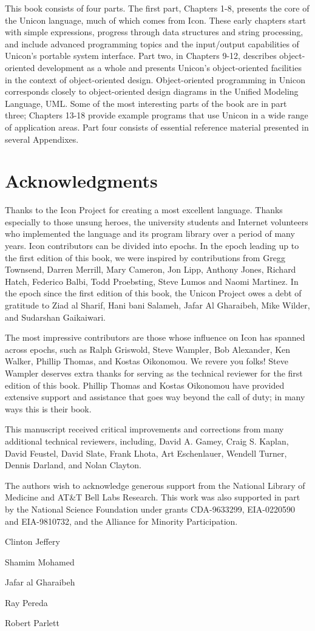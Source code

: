 This book consists of four parts. The first part, Chapters 1-8, presents
the core of the Unicon language, much of which comes from Icon. These
early chapters start with simple expressions, progress through data
structures and string processing, and include advanced programming
topics and the input/output capabilities of Unicon's
portable system interface. Part two, in Chapters 9-12,
describes object-oriented development as a whole and presents
Unicon's object-oriented facilities in the context of
object-oriented design. Object-oriented programming in Unicon
corresponds closely to object-oriented design diagrams in the Unified
Modeling Language, UML. Some of the most interesting parts of the book
are in part three; Chapters 13-18 provide example programs that use
Unicon in a wide range of application areas. Part four consists of
essential reference material presented in several Appendixes.

\section*{Acknowledgments}

Thanks to the Icon Project for creating a most excellent language.
Thanks especially to those unsung heroes, the university students and
Internet volunteers who implemented the language and its program
library over a period of many years. Icon contributors can be divided
into epochs. In the epoch leading up to the first edition of this
book, we were inspired by contributions from Gregg Townsend, Darren
Merrill, Mary Cameron, Jon Lipp, Anthony Jones, Richard Hatch,
Federico Balbi, Todd Proebsting, Steve Lumos and Naomi Martinez.  In
the epoch since the first edition of this book, the Unicon Project
owes a debt of gratitude to Ziad al Sharif, Hani bani Salameh, Jafar
Al Gharaibeh, Mike Wilder, and Sudarshan Gaikaiwari.

The most impressive contributors are those whose influence on Icon has
spanned across epochs, such as Ralph Griswold, Steve Wampler, Bob
Alexander, Ken Walker, Phillip Thomas, and Kostas Oikonomou. We revere
you folks! Steve Wampler deserves extra thanks for serving as the
technical reviewer for the first edition of this book.  Phillip Thomas
and Kostas Oikonomou have provided extensive support and assistance
that goes way beyond the call of duty; in many ways this is their book.

This manuscript received critical improvements and corrections from
many additional technical reviewers, including, David
A.  Gamey, Craig S. Kaplan, David Feustel, David Slate,
Frank Lhota, Art Eschenlauer, Wendell Turner, Dennis
Darland, and Nolan Clayton.

The authors wish to acknowledge generous support from the National
Library of Medicine and AT\&T Bell Labs Research.
This work was also supported in part by the National
Science Foundation under grants CDA-9633299, EIA-0220590 and
EIA-9810732, and the Alliance for Minority Participation.

Clinton Jeffery

Shamim Mohamed

Jafar al Gharaibeh

Ray Pereda

Robert Parlett
